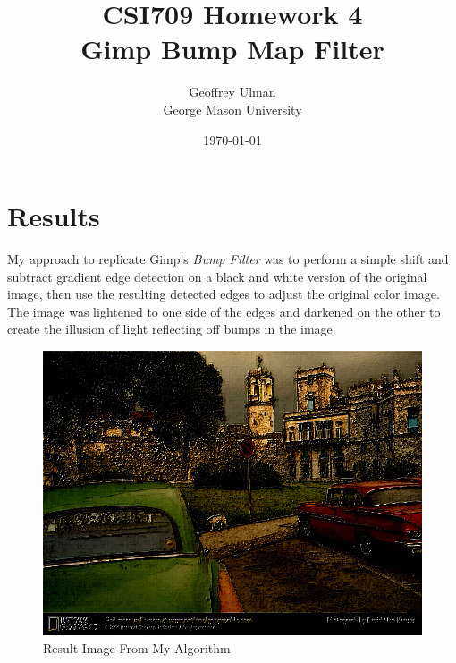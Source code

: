 \documentclass[12pt]{article}
\begin{document}
\title{CSI709 Homework 4 \\
Gimp Bump Map Filter}
\author{
        Geoffrey Ulman \\
        George Mason University\\
}
\date{\today}

\maketitle

\section{Results}

My approach to replicate Gimp's \emph{Bump Filter} was to perform a simple shift and subtract gradient edge detection on a black and white version of the original image, then use the resulting detected edges to adjust the original color image. The image was lightened to one side of the edges and darkened on the other to create the illusion of light reflecting off bumps in the image.

\begin{figure}
\centering
\includegraphics[width=1.00\textwidth]{geoff_ulman_homework4_result.png}
\caption{Result Image From My Algorithm}
\label{result_mine}
\end{figure}
\end{document}
